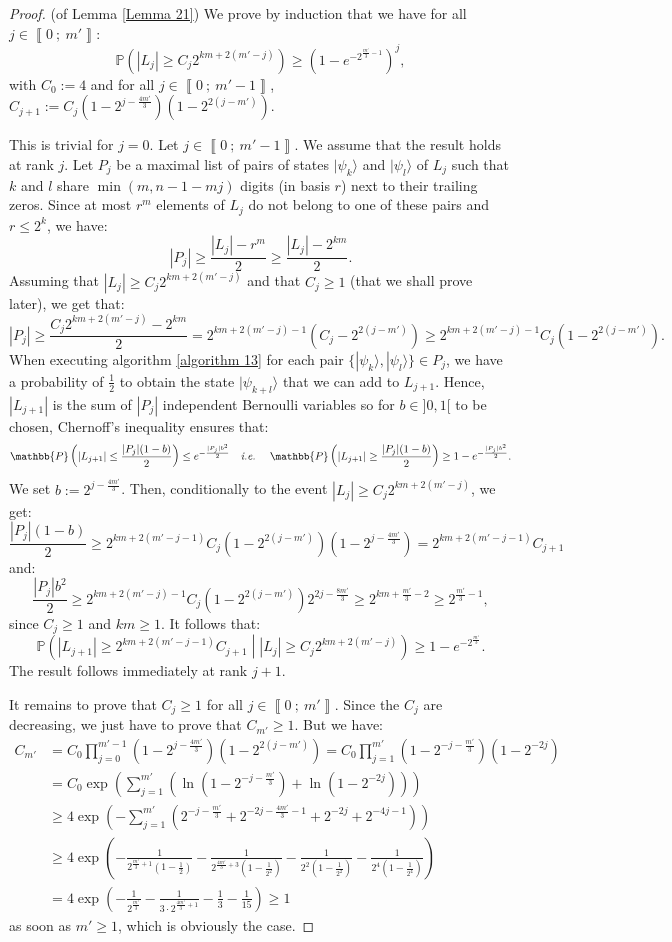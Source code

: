 \documentclass[a4paper,10pt]{report}
\theoremstyle{definition}
\theoremstyle{plain}
\theoremstyle{definition}
\newcommand{\ie}{\emph{i.e.}\ }
\renewcommand{\i}[2]{\left\llbracket #1~;~#2\right\rrbracket}
\renewcommand{\(}{\left(}
\renewcommand{\)}{\right)}
\renewcommand{\P}{\mathbb{P}}
\begin{document}
\begin{proof} (of Lemma \ref{Lemma 21})
We prove by induction that we have for all $j\in\i{0}{m'}$:
\[\P\(|L_j|\geq C_j 2^{km+2(m'-j)}\)\geq \(1-e^{-2^{\frac{m'}{3}-1}}\)^j,\]
with $C_0:=4$ and for all $j\in\i{0}{m'-1}$, $C_{j+1}:=C_j(1-2^{j-\frac{4m'}{3}})(1-2^{2(j-m')})$. 

This is trivial for $j=0$. Let $j\in\i{0}{m'-1}$. We assume that the result holds at rank $j$. Let $P_j$ be a maximal list of pairs of states $|\psi_k\rangle$ and $|\psi_l\rangle$ of $L_j$ such that $k$ and $l$ share $\min(m,n-1-mj)$ digits (in basis $r$) next to their trailing zeros. Since at most $r^m$ elements of $L_j$ do not belong to one of these pairs and $r\leq 2^k$, we have:
\[|P_j|\geq \frac{|L_j|-r^m}{2}\geq \frac{|L_j|-2^{km}}{2}.\]
Assuming that $|L_j|\geq C_j 2^{km+2(m'-j)}$ and that $C_j\geq 1$ (that we shall prove later), we get that:
\[|P_j|\geq \frac{C_j 2^{km+2(m'-j)} -2^{km}}{2}=2^{km+2(m'-j)-1}(C_j-2^{2(j-m')})\geq 2^{km+2(m'-j)-1}C_j(1-2^{2(j-m')}) .\] 
When executing algorithm \ref{algorithm 13} for each pair $\{|\psi_k\rangle, |\psi_l\rangle\}\in P_j$, we have a probability of $\frac{1}{2}$ to obtain the state $|\psi_{k+l}\rangle$ that we can add to $L_{j+1}$. Hence, $|L_{j+1}|$ is the sum of $|P_j|$ independent Bernoulli variables so for $b\in]0,1[$ to be chosen, Chernoff's inequality ensures that:
\[\P\(|L_{j+1}|\leq \frac{|P_j|(1-b)}{2}\)\leq e^{-\frac{|P_j|b^2}{2}} \quad \mbox{\ie} \quad \P\(|L_{j+1}|\geq \frac{|P_j|(1-b)}{2}\)\geq 1-e^{-\frac{|P_j|b^2}{2}}.\]
We set $b:=2^{j-\frac{4m'}{3}}$. Then, conditionally to the event $|L_j|\geq C_j 2^{km+2(m'-j)}$, we get:
\[\frac{|P_j|(1-b)}{2}\geq 2^{km+2(m'-j-1)}C_j(1-2^{2(j-m')})(1-2^{j-\frac{4m'}{3}})= 2^{km+2(m'-j-1)}C_{j+1}\]
and:
\[\frac{|P_j|b^2}{2}\geq 2^{km+2(m'-j)-1}C_j(1-2^{2(j-m')})2^{2j-\frac{8m'}{3}}\geq 2^{km+\frac{m'}{3}-2}\geq 2^{\frac{m'}{3}-1},\]
since $C_j\geq 1$ and $km\geq 1$. It follows that:
\[\P\(|L_{j+1}|\geq 2^{km+2(m'-j-1)}C_{j+1}\middle| |L_j|\geq C_j 2^{km+2(m'-j)} \)\geq 1-e^{-2^{\frac{m'}{3}}}.\]
The result follows immediately at rank $j+1$. 

It remains to prove that $C_j\geq 1$ for all $j\in\i{0}{m'}$. Since the $C_j$ are decreasing, we just have to prove that $C_{m'}\geq 1$. But we have:
\begin{align*}
C_{m'}&=C_0\prod_{j=0}^{m'-1}\(1-2^{j-\frac{4m'}{3}}\)\(1-2^{2(j-m')}\)=C_0\prod_{j=1}^{m'}\(1-2^{-j-\frac{m'}{3}}\)\(1-2^{-2j}\)\\
&=C_0\exp\(\sum_{j=1}^{m'}\(\ln\(1-2^{-j-\frac{m'}{3}}\)+\ln\(1-2^{-2j}\)\)\)\\
&\geq 4\exp\(-\sum_{j=1}^{m'}\(2^{-j-\frac{m'}{3}}+2^{-2j-\frac{4m'}{3}-1}+2^{-2j}+2^{-4j-1}\)\)\\
&\geq 4\exp\(-\frac{1}{2^{\frac{m'}{3}+1}\(1-\frac{1}{2}\)}-\frac{1}{2^{\frac{4m'}{3}+3}\(1-\frac{1}{2^2}\)}-\frac{1}{2^{2}\(1-\frac{1}{2^2}\)}-\frac{1}{2^{4}\(1-\frac{1}{2^4}\)}\)\\
&= 4\exp\(-\frac{1}{2^{\frac{m'}{3}}}-\frac{1}{3\cdot 2^{\frac{4m'}{3}+1}}-\frac{1}{3}-\frac{1}{15}\)\geq 1
\end{align*}
as soon as $m'\geq 1$, which is obviously the case.
\end{proof}
\end{document}
